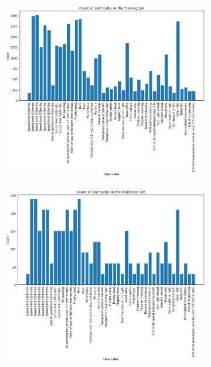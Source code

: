 \documentclass[]{article}
\begin{document}
\begin{figure}[p]
	\centering
	\begin{subfigure}{0.5\textwidth}
		\centering
		\includegraphics[width=\textwidth]{balance}
	\end{subfigure}%
	\begin{subfigure}{0.5\textwidth}
		\centering
		\includegraphics[width=\textwidth]{balance2}
	\end{subfigure}
	\begin{subfigure}{0.5\textwidth}

\end{subfigure}
\end{figure}
\end{document}
